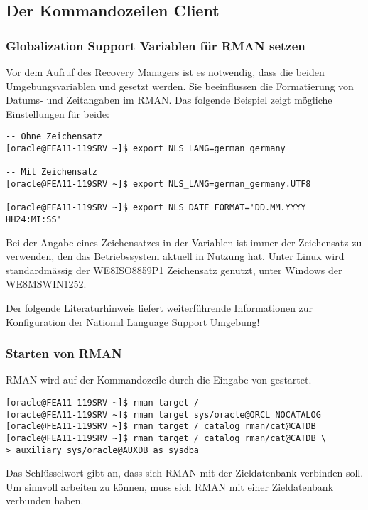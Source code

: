       \subsection{Der Kommandozeilen Client}
        \subsubsection{Globalization Support Variablen f\"ur RMAN setzen}
          Vor dem Aufruf des Recovery Managers ist es notwendig, dass die beiden Umgebungsvariablen  und  gesetzt werden. Sie beeinflussen die Formatierung von Datums- und Zeitangaben im RMAN. Das folgende Beispiel zeigt m\"ogliche Einstellungen f\"ur beide:
          \begin{lstlisting}[caption={Beispiel f\"ur \identifier{nls\_date\_format} und \identifier{nls\_lang}},label=admin1000,language=terminal]
-- Ohne Zeichensatz
[oracle@FEA11-119SRV ~]$ export NLS_LANG=german_germany

-- Mit Zeichensatz
[oracle@FEA11-119SRV ~]$ export NLS_LANG=german_germany.UTF8

[oracle@FEA11-119SRV ~]$ export NLS_DATE_FORMAT='DD.MM.YYYY HH24:MI:SS'
          \end{lstlisting}
\clearpage
          \begin{merke}
            Bei der Angabe eines Zeichensatzes in der Variablen  ist immer der Zeichensatz zu verwenden, den das Betriebssystem aktuell in Nutzung hat. Unter Linux wird standardm\"assig der WE8ISO8859P1 Zeichensatz genutzt, unter Windows der WE8MSWIN1252.
          \end{merke}
          Der folgende Literaturhinweis liefert weiterf\"uhrende Informationen zur Konfiguration der National Language Support Umgebung!
          \begin{literaturinternet}
            \item \cite{NLSPG189}
          \end{literaturinternet}
        \subsubsection{Starten von RMAN}
          RMAN wird auf der Kommandozeile durch die Eingabe von  gestartet.
          \begin{lstlisting}[caption={Starten des RMAN},label=admin1001,language=terminal]
[oracle@FEA11-119SRV ~]$ rman target /
[oracle@FEA11-119SRV ~]$ rman target sys/oracle@ORCL NOCATALOG
[oracle@FEA11-119SRV ~]$ rman target / catalog rman/cat@CATDB
[oracle@FEA11-119SRV ~]$ rman target / catalog rman/cat@CATDB \
> auxiliary sys/oracle@AUXDB as sysdba
          \end{lstlisting}
          \begin{merke}
            Das Schl\"usselwort  gibt an, dass sich RMAN mit der Zieldatenbank verbinden soll. Um sinnvoll arbeiten zu k\"onnen, muss sich RMAN mit einer Zieldatenbank verbunden haben.
          \end{merke}

